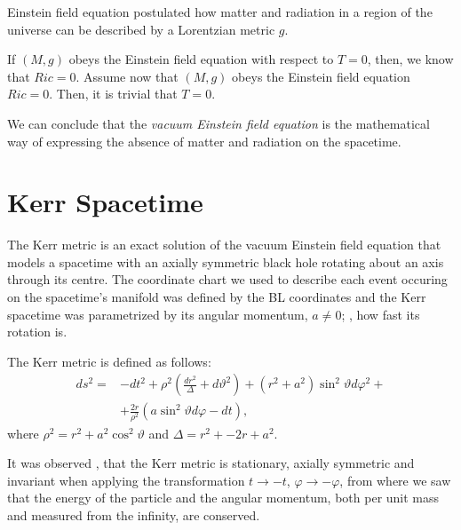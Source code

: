 Einstein field equation postulated how matter and radiation in a region of the universe can be described by a Lorentzian metric $g$.

If $(M,g)$ obeys the Einstein field equation with respect to $T = 0$, then, we know that $Ric = 0$. Assume now that $(M,g)$ obeys the Einstein field equation $Ric = 0$. Then, it is trivial that $T=0$.

We can conclude that the \emph{vacuum Einstein field equation} is the mathematical way of expressing the absence of matter and radiation on the spacetime.



















\section{Kerr Spacetime}
\label{chapter:kerr}

The Kerr metric is an exact solution of the vacuum Einstein field equation that models a spacetime with an axially symmetric black hole rotating about an axis through its centre. The coordinate chart we used to describe each event occuring on the spacetime's manifold was defined by the \ac{BL} coordinates and the Kerr spacetime was parametrized by its angular momentum, $a \neq 0$; \ie, how fast its rotation is.

The Kerr metric is defined as follows:
\begin{align}
	\label{eq:kerrmetric}
	ds^2 = &-dt^2 + \rho^2\left(\frac{dr^2}{\Delta} + d\vartheta^2\right) + \left(r^2 + a^2\right)\sin^2\vartheta d\varphi^2 + \\
	\nonumber
	&+ \frac{2r}{\rho^2}\left(a\sin^2\vartheta d\varphi - dt\right),
\end{align}
where $\rho^2 = r^2 + a^2\cos^2\vartheta$ and $\Delta = r^2 + -2r + a^2$.

It was observed \cite[Sec. 2.1]{galindo14}, \cite[pp. 58-59]{oneill95} that the Kerr metric is stationary, axially symmetric and invariant when applying the transformation $t \to -t$, $\varphi \to -\varphi$, from where we saw that the energy of the particle and the angular momentum, both per unit mass and measured from the infinity, are conserved.

